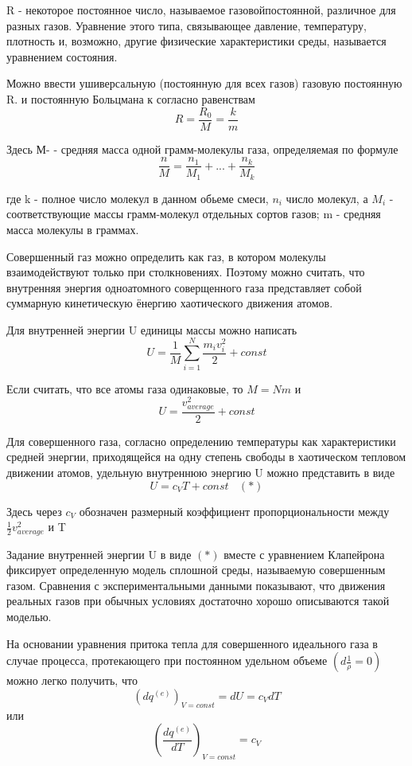 R - некоторое постоянное число, называемое газовойпостоянной, различное для разных газов. Уравнение этого типа, связывающее давление, температуру, плотность и, возможно, другие физические характеристики среды, называется уравнением состояния.

Можно ввести ушиверсальную (постоянную для всех газов) газовую постоянную R. и постоянную Больцмана к согласно равенствам
$$ R = \frac{R_0}{M} = \frac{k}{m} $$

Здесь М- - средняя масса одной грамм-молекулы газа, определяемая по формуле
$$ \frac{n}{M} = \frac{n_1}{M_1} + ... + \frac{n_k}{M_k} $$

где k - полное число молекул в данном обьеме смеси,  $n_i$ число молекул, а $M_i$ - соответствующие массы грамм-молекул отдельных сортов газов; m - средняя масса молекулы в граммах.

Совершенный газ можно определить как газ, в котором молекулы взаимодействуют только при столкновениях. Поэтому можно считать, что внутренняя энергия одноатомного соверщенного газа представляет собой суммарную кинетическую ёнергию хаотического движения атомов. 

Для внутренней энергии U единицы массы можно написать
$$ U = \frac{1}{M}\sum\limits_{i=1}^{N}\frac{m_iv_i^2}{2} + const $$

Если считать, что все атомы газа одинаковые, то $M = Nm$ и 
$$ U = \frac{v_{average}^2}{2} + const $$

Для совершенного газа, согласно определению температуры как характеристики средней энергии, приходящейся на одну степень свободы в хаотическом тепловом движении атомов, удельную внутреннюю энергию U можно представить в виде
$$ U = c_VT + const \ \ \ \ (*)$$

Здесь через $c_V$ обозначен размерный коэффициент пропорциональности между $\frac{1}{2}v_{average}^2$ и T

Задание внутренней энергии U в виде $(*)$ вместе с уравнением Клапейрона фиксирует определенную модель сплошной среды, называемую совершенным газом. Сравнения с экспериментальными данными показывают, что движения реальных газов при обычных условиях достаточно хорошо описываются такой моделью.

На основании уравнения притока тепла для совершенного идеального газа в случае процесса, протекающего при постоянном удельном объеме $\left(\displaystyle d\frac{1}{\rho}=0\right)$ можно легко получить, что
$$ (dq^{(e)})_{V = const} = dU = c_VdT $$
или
$$ \left( \frac{dq^{(e)}}{dT} \right)_{V=const} = c_V $$

